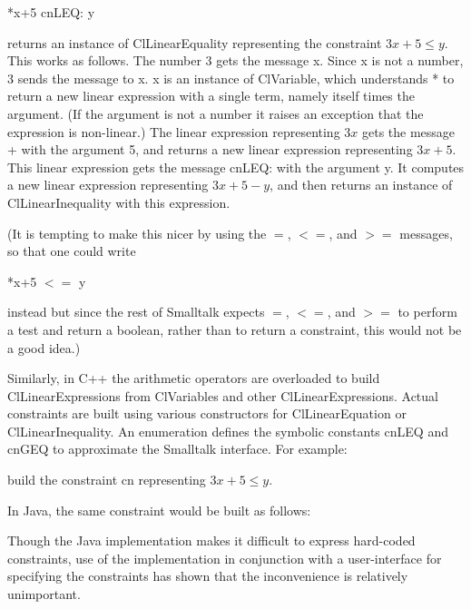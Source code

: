 \documentclass{article}
\begin{document}
\hspace*{1cm} {*x+5 cnLEQ: y}

returns an instance of {\sf ClLinearEquality} representing the
constraint $3 x + 5 \leq y$.  This works as follows.  The number 3 gets
the message {\sf * x}.  Since {\sf x} is not a number, 3 sends the
message {} to {\sf x}.  {\sf x} is an instance of {\sf
  ClVariable}, which understands * to return a new linear expression
with a single term, namely itself times the argument.  (If the argument
is not a number it raises an exception that the expression is
non-linear.)  The linear expression representing $3x$ gets the message +
with the argument 5, and returns a new linear expression representing $3
x + 5$.  This linear expression gets the message {\sf cnLEQ:} with the
argument {\sf y}.  It computes a new linear expression representing $3 x
+ 5 - y$, and then returns an instance of {\sf ClLinearInequality} with
this expression.

(It is tempting to make this nicer by using the $=$, $<=$, and $>=$
messages, so that one could write

\hspace*{1 cm} {*x+5 $<=$ y}

instead but since the rest of Smalltalk expects $=$, $<=$, and $>=$ to
perform a test and return a boolean, rather than to return a constraint,
this would not be a good idea.)

Similarly, in C++ the arithmetic operators are overloaded to build {\sf
  ClLinearExpression}s from {\sf ClVariable}s and other {\sf
  ClLinearExpression}s.  Actual constraints are built using various
constructors for {\sf ClLinearEquation} or {\sf ClLinearInequality}.  An
enumeration defines the symbolic constants {\sf cnLEQ} and {\sf cnGEQ}
to approximate the Smalltalk interface.  For example:

\hspace*{1 cm}{\sf ClLinearInequality cn(3*x+5, cnLEQ, y); ~ ~ ~ // C++}

build the constraint {\sf cn} representing $3 x + 5 \leq y$.

In Java, the same constraint would be built as follows:

\hspace*{1 cm}{\sf ClLinearInequality cn = new
  ClLinearInequality(CL.Plus(CL.Times(x,3),5), CL.LEQ, y);}

Though the Java implementation makes it difficult to express hard-coded
constraints, use of the implementation in conjunction with a
user-interface for specifying the constraints has shown that the
inconvenience is relatively unimportant.
\end{document}
